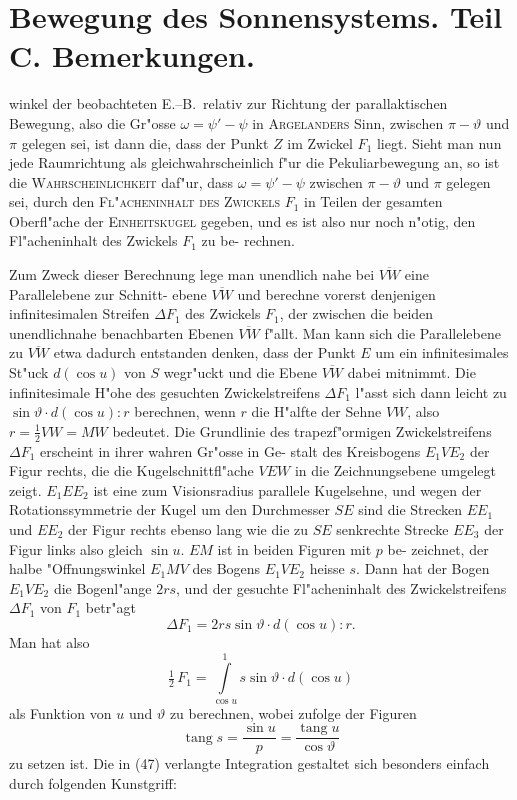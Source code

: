 \documentclass[12pt,a4paper]{article}
\DeclareMathOperator{\tang}{tang}
\theoremstyle{plain}
\theoremstyle{definition}
\theoremstyle{remark}
\begin{document}
\newpage
\section*{Bewegung des Sonnensystems. Teil C. Bemerkungen.}

winkel der beobachteten E.--B.\ relativ zur Richtung der parallaktischen Bewegung, also die Gr"osse
$\omega = \psi' - \psi$ in \textsc{Argelanders} Sinn, zwischen $\pi - \vartheta$ und $\pi$ gelegen sei, ist dann die, dass der Punkt $Z$ im
Zwickel $F_1$ liegt. Sieht man nun jede Raumrichtung als gleichwahrscheinlich f"ur die Pekuliarbewegung
an, so ist die \textsc{Wahrscheinlichkeit} daf"ur, dass $\omega = \psi' - \psi$ zwischen $\pi - \vartheta$ und $\pi$ gelegen sei,
durch den \textsc{Fl"acheninhalt des Zwickels} $F_1$ in Teilen der gesamten Oberfl"ache der
\textsc{Einheitskugel} gegeben, und es ist also nur noch n"otig, den Fl"acheninhalt des Zwickels $F_1$ zu be-
rechnen.

Zum Zweck dieser Berechnung lege man unendlich nahe bei $\overline{VW}$ eine Parallelebene zur Schnitt-
ebene $\overline{VW}$ und berechne vorerst denjenigen infinitesimalen Streifen $\Delta F_1$ des Zwickels $F_1$, der zwischen
die beiden unendlichnahe benachbarten Ebenen $\overline{VW}$ f"allt. Man kann sich die Parallelebene zu $\overline{VW}$ etwa
dadurch entstanden denken, dass der Punkt $E$ um ein infinitesimales St"uck $d(\cos u)$ von $S$ wegr"uckt und
die Ebene $\overline{VW}$ dabei mitnimmt. Die infinitesimale H"ohe des gesuchten Zwickelstreifens $\Delta F_1$ l"asst sich
dann leicht zu $\sin \vartheta \cdot d(\cos u) : r$ berechnen, wenn $r$ die H"alfte der Sehne $VW$, also $r = \tfrac{1}{2}VW = MW$
bedeutet. Die Grundlinie des trapezf"ormigen Zwickelstreifens $\Delta F_1$ erscheint in ihrer wahren Gr"osse in Ge-
stalt des Kreisbogens $E_1VE_2$ der Figur rechts, die die Kugelschnittfl"ache $VEW$ in die Zeichnungsebene
umgelegt zeigt. $E_1EE_2$ ist eine zum Visionsradius parallele Kugelsehne, und wegen der Rotationssymmetrie
der Kugel um den Durchmesser $SE$ sind die Strecken $EE_1$ und $EE_2$ der Figur rechts ebenso lang wie die
zu $SE$ senkrechte Strecke $EE_3$ der Figur links also gleich $\sin u$. $EM$ ist in beiden Figuren mit $p$ be-
zeichnet, der halbe "Offnungswinkel $E_1MV$ des Bogens $E_1VE_2$ heisse $s$. Dann hat der Bogen $E_1VE_2$ die
Bogenl"ange $2rs$, und der gesuchte Fl"acheninhalt des Zwickelstreifens $\Delta F_1$ von $F_1$ betr"agt
\begin{equation}\tag{46}
\Delta F_1 = 2rs \sin \vartheta \cdot d(\cos u) : r.
\end{equation}
Man hat also
\begin{equation}\tag{47}
\tfrac{1}{2}\,F_1 = \int\limits_{\cos u}^{1} s \sin \vartheta \cdot d(\cos u)
\end{equation}
als Funktion von $u$ und $\vartheta$ zu berechnen, wobei zufolge der Figuren
\begin{equation}\tag{48}
\tang s = \frac{\sin u}{p} = \frac{\tang u}{\cos \vartheta}
\end{equation}
zu setzen ist. Die in (47) verlangte Integration gestaltet sich besonders einfach durch folgenden Kunstgriff:
\end{document}
